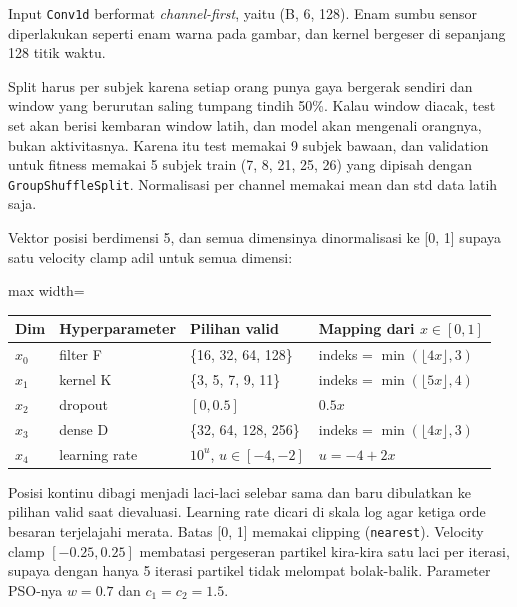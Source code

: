 
Input \texttt{Conv1d} berformat \emph{channel-first}, yaitu (B, 6, 128). Enam sumbu sensor diperlakukan seperti enam warna pada gambar, dan kernel bergeser di sepanjang 128 titik waktu.

Split harus per subjek karena setiap orang punya gaya bergerak sendiri dan window yang berurutan saling tumpang tindih 50\%. Kalau window diacak, test set akan berisi kembaran window latih, dan model akan mengenali orangnya, bukan aktivitasnya. Karena itu test memakai 9 subjek bawaan, dan validation untuk fitness memakai 5 subjek train (7, 8, 21, 25, 26) yang dipisah dengan \texttt{GroupShuffleSplit}. Normalisasi per channel memakai mean dan std data latih saja.

Vektor posisi berdimensi 5, dan semua dimensinya dinormalisasi ke [0, 1] supaya satu velocity clamp adil untuk semua dimensi:

\begin{adjustbox}{max width=\textwidth}\begin{tabular}{@{}llll@{}}
\toprule
\textbf{Dim} & \textbf{Hyperparameter} & \textbf{Pilihan valid} & \textbf{Mapping dari $x \in [0,1]$} \\
\midrule
$x_0$ & filter F & \{16, 32, 64, 128\} & indeks = $\min(\lfloor 4x \rfloor, 3)$ \\
$x_1$ & kernel K & \{3, 5, 7, 9, 11\} & indeks = $\min(\lfloor 5x \rfloor, 4)$ \\
$x_2$ & dropout & $[0, 0.5]$ & $0.5x$ \\
$x_3$ & dense D & \{32, 64, 128, 256\} & indeks = $\min(\lfloor 4x \rfloor, 3)$ \\
$x_4$ & learning rate & $10^{u}$, $u \in [-4, -2]$ & $u = -4 + 2x$ \\
\bottomrule
\end{tabular}\end{adjustbox}

Posisi kontinu dibagi menjadi laci-laci selebar sama dan baru dibulatkan ke pilihan valid saat dievaluasi. Learning rate dicari di skala log agar ketiga orde besaran terjelajahi merata. Batas [0, 1] memakai clipping (\texttt{nearest}). Velocity clamp $[-0.25, 0.25]$ membatasi pergeseran partikel kira-kira satu laci per iterasi, supaya dengan hanya 5 iterasi partikel tidak melompat bolak-balik. Parameter PSO-nya $w = 0.7$ dan $c_1 = c_2 = 1.5$.

